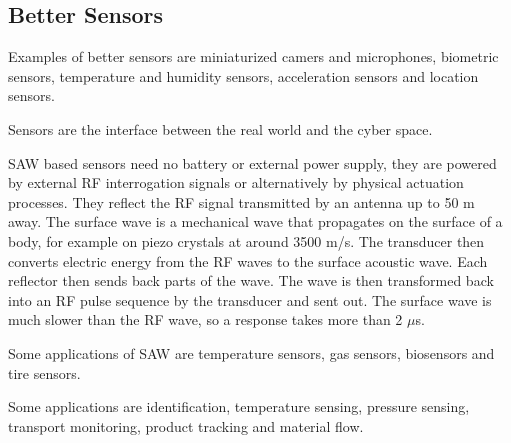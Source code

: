 \subsection{Better Sensors}
\begin{mytitle} Examples of better sensors are miniaturized camers and microphones, biometric sensors, temperature and humidity sensors, acceleration sensors and location sensors.
\end{mytitle}
\begin{myremark} Sensors are the interface between the real world and the cyber space.
\end{myremark}
\begin{mytitle} SAW based sensors need no battery or external power supply, they are powered by external RF interrogation signals or alternatively by physical actuation processes. They reflect the RF signal transmitted by an antenna up to 50 m away. The surface wave is a mechanical wave that propagates on the surface of a body, for example on piezo crystals at around 3500 m/s. The transducer then converts electric energy from the RF waves to the surface acoustic wave. Each reflector then sends back parts of the wave. The wave is then transformed back into an RF pulse sequence by the transducer and sent out. The surface wave is much slower than the RF wave, so a response takes more than 2 $\mu$s.
\end{mytitle}
\begin{mytitle}[Applications]
    \begin{mysubtitle} Some applications of SAW are temperature sensors, gas sensors, biosensors and tire sensors.
    \end{mysubtitle}
    \begin{mysubtitle} Some applications are identification, temperature sensing, pressure sensing, transport monitoring, product tracking and material flow.
    \end{mysubtitle}
\end{mytitle}

